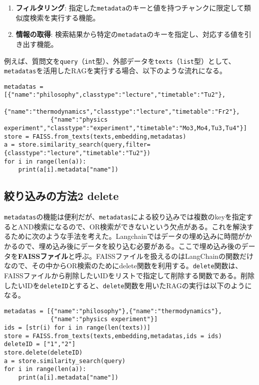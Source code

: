 \begin{enumerate}
    \item \textbf{フィルタリング}: 指定した\texttt{metadata}のキーと値を持つチャンクに限定して類似度検索を実行する機能。
    \item \textbf{情報の取得}: 検索結果から特定の\texttt{metadata}のキーを指定し、対応する値を引き出す機能。
\end{enumerate}

例えば、質問文を\texttt{query}（\texttt{int}型）、外部データを\texttt{texts}（\texttt{list}型）として、\texttt{metadatas}を活用したRAGを実行する場合、以下のような流れになる。

\begin{lstlisting}[caption=metadatasの例]
metadatas = [{"name":"philosophy",classtype":"lecture","timetable":"Tu2"},
             {"name":"thermodynamics","classtype":"lecture","timetable":"Fr2"},
             {"name":"physics experiment","classtype":"experiment","timetable":"Mo3,Mo4,Tu3,Tu4"}]
store = FAISS.from_texts(texts,embedding,metadatas)
a = store.similarity_search(query,filter={classtype":"lecture","timetable":"Tu2"})
for i in range(len(a)):
    print(a[i].metadata["name"])
\end{lstlisting}

\subsection{絞り込みの方法2 delete}
\texttt{metadatas}の機能は便利だが、\texttt{metadatas}による絞り込みでは複数のkeyを指定するとAND検索になるので、OR検索ができないという欠点がある。これを解決するために次のような手法を考えた。Langchainではデータの埋め込みに時間がかかるので、埋め込み後にデータを絞り込む必要がある。ここで埋め込み後のデータを\textbf{FAISSファイル}と呼ぶ。FAISSファイルを扱えるのはLangChainの関数だけなので、その中からOR検索のためにdelete関数を利用する。\texttt{delete}関数は、FAISSファイルから削除したいIDをリストで指定して削除する関数である。削除したいIDを\texttt{deleteID}とすると、\texttt{delete}関数を用いたRAGの実行は以下のようになる。

\begin{lstlisting}[caption=deleteの例]
metadatas = [{"name":"philosophy"},{"name":"thermodynamics"},
             {"name":"physics experiment"}]
ids = [str(i) for i in range(len(texts))]
store = FAISS.from_texts(texts,embedding,metadatas,ids = ids)
deleteID = ["1","2"]
store.delete(deleteID)
a = store.similarity_search(query)
for i in range(len(a)):
    print(a[i].metadata["name"])
\end{lstlisting}

